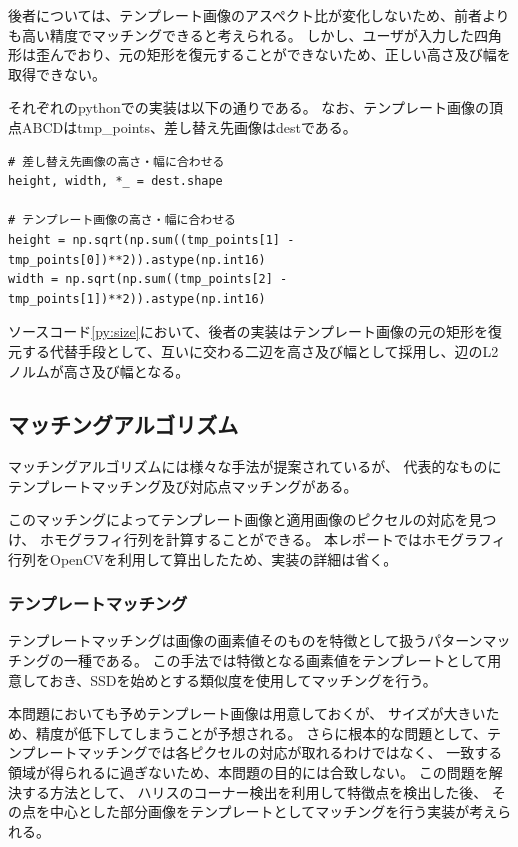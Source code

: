 後者については、テンプレート画像のアスペクト比が変化しないため、前者よりも高い精度でマッチングできると考えられる。
しかし、ユーザが入力した四角形は歪んでおり、元の矩形を復元することができないため、正しい高さ及び幅を取得できない。

それぞれのpythonでの実装は以下の通りである。
なお、テンプレート画像の頂点ABCDはtmp\_points、差し替え先画像はdestである。
\begin{lstlisting}[caption=画像サイズ, label=py:size]
# 差し替え先画像の高さ・幅に合わせる
height, width, *_ = dest.shape

# テンプレート画像の高さ・幅に合わせる
height = np.sqrt(np.sum((tmp_points[1] - tmp_points[0])**2)).astype(np.int16)
width = np.sqrt(np.sum((tmp_points[2] - tmp_points[1])**2)).astype(np.int16)
\end{lstlisting}
ソースコード\ref{py:size}において、後者の実装はテンプレート画像の元の矩形を復元する代替手段として、互いに交わる二辺を高さ及び幅として採用し、辺のL2ノルムが高さ及び幅となる。

\subsection{マッチングアルゴリズム}
マッチングアルゴリズムには様々な手法が提案されているが、
代表的なものにテンプレートマッチング及び対応点マッチングがある。

このマッチングによってテンプレート画像と適用画像のピクセルの対応を見つけ、
ホモグラフィ行列を計算することができる。
本レポートではホモグラフィ行列をOpenCVを利用して算出したため、実装の詳細は省く。

\subsubsection{テンプレートマッチング}
テンプレートマッチングは画像の画素値そのものを特徴として扱うパターンマッチングの一種である\cite{cv}。
この手法では特徴となる画素値をテンプレートとして用意しておき、SSDを始めとする類似度を使用してマッチングを行う\cite{cv}。

本問題においても予めテンプレート画像は用意しておくが、
サイズが大きいため、精度が低下してしまうことが予想される。
さらに根本的な問題として、テンプレートマッチングでは各ピクセルの対応が取れるわけではなく、
一致する領域が得られるに過ぎないため、本問題の目的には合致しない。
この問題を解決する方法として、
ハリスのコーナー検出\cite{cv}を利用して特徴点を検出した後、
その点を中心とした部分画像をテンプレートとしてマッチングを行う実装が考えられる。

